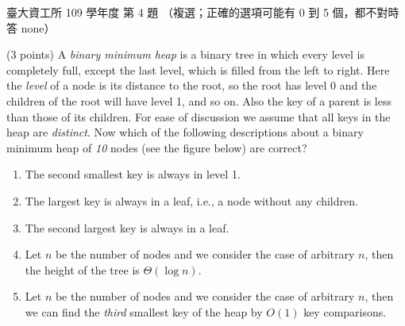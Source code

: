 \begin{pastexam}[label={px:ntu-109-dsaa-04}]{臺大資工所 109 學年度 第 4 題}
（複選；正確的選項可能有 0 到 5 個，都不對時答 none）

(3 points) A \textit{binary minimum heap} is a binary tree in which every level is completely
full, except the last level, which is filled from the left to right. Here the \textit{level} of a
node is its distance to the root, so the root has level 0 and the children of the root will have
level 1, and so on. Also the key of a parent is less than those of its children. For ease of
discussion we assume that all keys in the heap are \textit{distinct}. Now which of the following
descriptions about a binary minimum heap of \textit{10} nodes (see the figure below) are correct?

\begin{center}
\end{center}

\begin{enumerate}[label=\arabic*.]
\item The second smallest key is always in level 1.
\item The largest key is always in a leaf, i.e., a node without any children.
\item The second largest key is always in a leaf.
\item Let $n$ be the number of nodes and we consider the case of arbitrary $n$, then the height
of the tree is $\Theta(\log n)$.
\item Let $n$ be the number of nodes and we consider the case of arbitrary $n$, then we can find
the \textit{third} smallest key of the heap by $O(1)$ key comparisons.
\end{enumerate}
\end{pastexam}

